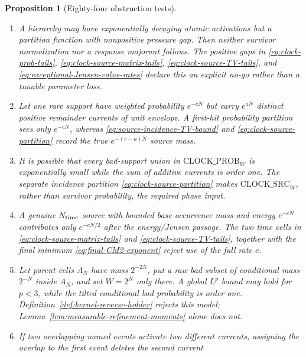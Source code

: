 \documentclass[11pt]{article}
\newtheorem{proposition}[theorem]{Proposition}
\begin{document}
\begin{proposition}[Eighty-four obstruction tests]
\begin{enumerate}[label=\textup{(T\arabic*)}]
      endpoint scale, or $\widetilde G_N^\pm$.  The survivor indicator in
      \eqref{eq:upper-scale-excess-tail} prevents the upper-scale ledger from
      evaluating a nonexistent random variable; cemetery mass is charged by
      $\mathrm{CEM\_DOM}$ and $\mathrm{CLOCK\_PROB}_{W}$.
\item A hierarchy may have exponentially decaying atomic activations but a
      partition function with nonpositive pressure gap.  Then neither
      survivor normalization nor a response majorant follows.  The positive
      gaps in \eqref{eq:clock-prob-tails},
      \eqref{eq:clock-source-matrix-tails},
      \eqref{eq:clock-source-TV-tails}, and
      \eqref{eq:exceptional-Jensen-value-rates} declare this an explicit
      no-go rather than a tunable parameter loss.
\item Let one rare support have weighted probability $e^{-cN}$ but carry
      $e^{aN}$ distinct positive remainder currents of unit envelope.  A
      first-hit probability partition sees only $e^{-cN}$, whereas
      \eqref{eq:source-incidence-TV-bound} and
      \eqref{eq:clock-source-partition} record the true
      $e^{-(c-a)N}$ source mass.
\item It is possible that every bad-support union in
      $\mathrm{CLOCK\_PROB}_{W}$ is exponentially small while the sum of
      additive currents is order one.  The separate incidence partition
      \eqref{eq:clock-source-partition} makes
      $\mathrm{CLOCK\_SRC}_{W}$, rather than survivor probability, the
      required phase input.
\item A genuine $N_{\rm time}$ source with bounded base occurrence mass and
      energy $e^{-cN}$ contributes only $e^{-cN/2}$ after the
      energy/Jensen passage.  The two time
      cells in \eqref{eq:clock-source-matrix-tails} and
      \eqref{eq:clock-source-TV-tails}, together with the final minimum
      \eqref{eq:final-CM2-exponent} reject use of the full rate $c$.
\item Let parent cells $A_N$ have mass $2^{-2N}$, put a raw bad subset of
      conditional mass $2^{-N}$ inside $A_N$, and set $W=2^N$ only there.
      A global $L^p$ bound may hold for $p<3$, while the tilted conditional
      bad probability is order one.  Definition~\ref{def:kernel-reverse-holder}
      rejects this model; Lemma~\ref{lem:measurable-refinement-moments} alone
      does not.
\item If two overlapping named events activate two different currents,
      assigning the overlap to the first event deletes the second current

\end{enumerate}
\end{proposition}
\end{document}
